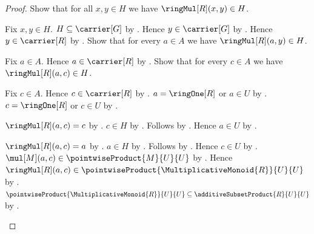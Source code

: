 \begin{proof}
    Show that for all $x,y\in H$ we have $\ringMul[R](x,y)\in H$.
    \begin{subproof}
        Fix $x,y\in H$.
        $H\subseteq\carrier[G]$ by .
        Hence $y\in\carrier[G]$ by .
        Hence $y\in\carrier[R]$ by \auto.
        Show that for every $a\in A$ we have $\ringMul[R](a,y)\in H$.
        \begin{subproof}
            Fix $a\in A$.
            Hence $a\in\carrier[R]$ by .
            Show that for every $c\in A$ we have
                $\ringMul[R](a,c)\in H$.
            \begin{subproof}
                Fix $c\in A$.
                Hence $c\in\carrier[R]$ by .
                $a=\ringOne[R]$ or $a\in U$ by
                    .
                $c=\ringOne[R]$ or $c\in U$ by
                    .
                \begin{byCase}
                        $\ringMul[R](a,c)=c$ by
                            .
                        $c\in H$ by .
                        Follows by \auto.
                        Hence $a\in U$ by \auto.
                        \begin{byCase}
                                $\ringMul[R](a,c)=a$ by
                                    .
                                $a\in H$ by .
                                Follows by \auto.
                                Hence $c\in U$ by \auto.
                                $\mul[M](a,c)
                                    \in\pointwiseProduct{M}{U}{U}$ by
                                    .
                                Hence $\ringMul[R](a,c)
                                    \in\pointwiseProduct{
                                        \MultiplicativeMonoid{R}}{U}{U}$ by
                                    \auto.
                                $\pointwiseProduct{
                                        \MultiplicativeMonoid{R}}{U}{U}
                                    \subseteq
                                        \additiveSubsetProduct{R}{U}{U}$ by
                                    .

\end{byCase}
\end{byCase}
\end{subproof}
\end{subproof}
\end{subproof}
\end{proof}
